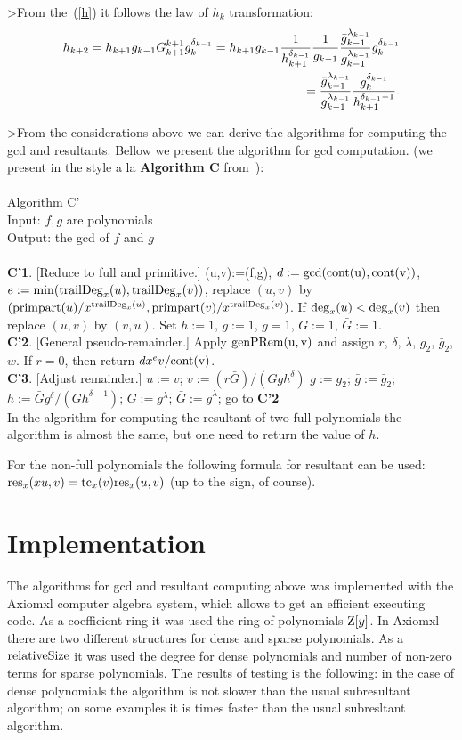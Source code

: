\documentclass[12pt,fullpage]{article}
\newcommand{\dg}{{\rm deg}_x}
\newcommand{\tdg}{{\rm trailDeg}_x}
\newcommand{\pp}{{\rm primpart}}
\newcommand{\res}{{\rm res}_x}
\newcommand{\tc}{{\rm tc}_x}
\newcommand{\genPRem}{\rm genPRem}
\newcommand{\cont}{\rm cont}
\newcommand{\relativeSize}{\rm relativeSize}
\begin{document}
>From the~(\ref{h}) it follows the law of $h_k$ transformation:
\begin{eqnarray}
h_{k+2}=h_{k+1}g_{k-1}G_{k+1}^{k+1}g_k^{\delta_{k-1}}=
h_{k+1}g_{k-1}{1\over{h_{k+1}^{\delta_{k-1}}}}{1\over g_{k-1}}
{{{\bar g}_{k-1}^{\lambda_{k-1}}}\over g_{k-1}^{\lambda_{k-1}}}g_k^{\delta_{k-1}}\cr
={{{\bar g}_{k-1}^{\lambda_{k-1}}}\over g_{k-1}^{\lambda_{k-1}}}
{{g_k^{\delta_{k-1}}}\over{h_{k+1}^{\delta_{k-1}-1}}}.\nonumber
\end{eqnarray}

>From the considerations above we can derive the algorithms for computing the gcd and
resultants. Bellow we present the algorithm for gcd computation. 
(we present in the style
a la {\bf Algorithm C} from~\cite{Knuth}):\\
~\\
Algorithm C'\\
Input: $f,g$ are polynomials\\ 
Output: the gcd of $f$ and $g$\\
~\\
\medskip
{\bf C'1}. [Reduce to full and primitive.]
 (u,v):=(f,g),
$d:=\gcd(\cont(u),\cont(v))$, $e:=\min(\tdg(u),\tdg(v))$,
replace $(u,v)$ by \\
$(\pp(u)/x^{\tdg(u)},\pp(v)/x^{\tdg(v)})$.
If $\dg(u)<\dg(v)$ then replace $(u,v)$ by $(v,u)$.
Set $h:=1$, $g:=1$, ${\bar g}=1$, $G:=1$, ${\bar G}:=1$.\\
{\bf C'2}. [General pseudo-remainder.] Apply $\genPRem(u,v)$ and assign
$r$,
$\delta$,
$\lambda$,
$g_2$,
${\bar g}_2$,
$w$.
If $r=0$, then return $dx^ev/\cont(v)$.\\ 
{\bf C'3}. [Adjust remainder.] 
$u:=v$;
$v:=(r{\bar G})/(Ggh^{\delta})$
$g:=g_2$;
${\bar g}:={\bar g}_2$;
$h:={\bar G}g^{\delta}/(Gh^{\delta-1})$;
$G:=g^{\lambda}$;
${\bar G}:={\bar g}^\lambda$;
go to {\bf C'2}\\

In the algorithm for computing the resultant of two full polynomials the algorithm is
almost the same, but one need to return the value of $h$.

For the non-full polynomials the following formula for resultant can be used: 
$\res(xu,v)=\tc(v)\res(u,v)$ (up to the sign, of course).

\section{Implementation}

The algorithms for gcd and resultant computing above was implemented with the Axiomxl 
computer algebra system,
which allows to get an efficient executing code. 
As a coefficient ring it was used the ring of polynomials ${\rm Z}[y]$.
In Axiomxl there are two different structures for dense and sparse
polynomials.
As a $\relativeSize$ it was used the degree for dense polynomials
and number of non-zero terms for sparse polynomials. 
The results of testing is
the following: in the case of dense polynomials
the algorithm is not slower than the usual subresultant algorithm;
on some examples it is times faster than the usual subresltant algorithm.
\end{document}
